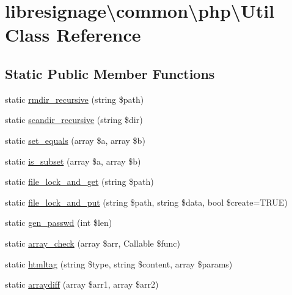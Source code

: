 \hypertarget{classlibresignage_1_1common_1_1php_1_1Util}{}\section{libresignage\textbackslash{}common\textbackslash{}php\textbackslash{}Util Class Reference}
\label{classlibresignage_1_1common_1_1php_1_1Util}
\subsection*{Static Public Member Functions}
\begin{DoxyCompactItemize}
\item 
static \hyperlink{classlibresignage_1_1common_1_1php_1_1Util_a8bd597e56331692f7839add43e70b2a5}{rmdir\+\_\+recursive} (string \$path)
\item 
static \hyperlink{classlibresignage_1_1common_1_1php_1_1Util_a8f938361f0ef775e8c1561fec505e40c}{scandir\+\_\+recursive} (string \$dir)
\item 
static \hyperlink{classlibresignage_1_1common_1_1php_1_1Util_a978ec58791862c65161cf2e6b06e75a1}{set\+\_\+equals} (array \$a, array \$b)
\item 
static \hyperlink{classlibresignage_1_1common_1_1php_1_1Util_a699286fe7901104c1849162017f22be7}{is\+\_\+subset} (array \$a, array \$b)
\item 
static \hyperlink{classlibresignage_1_1common_1_1php_1_1Util_a6515a0d313d4d6a929cd9a3b00d9eae5}{file\+\_\+lock\+\_\+and\+\_\+get} (string \$path)
\item 
static \hyperlink{classlibresignage_1_1common_1_1php_1_1Util_aac9e01c4936c976f5ffd712db0429b58}{file\+\_\+lock\+\_\+and\+\_\+put} (string \$path, string \$data, bool \$create=T\+R\+UE)
\item 
static \hyperlink{classlibresignage_1_1common_1_1php_1_1Util_ab8c8392529cfcfb2a143880c5d91f3bb}{gen\+\_\+passwd} (int \$len)
\item 
static \hyperlink{classlibresignage_1_1common_1_1php_1_1Util_ac5b8dc6b78eb2b1bf9a8b343cdfa38eb}{array\+\_\+check} (array \$arr, Callable \$func)
\item 
static \hyperlink{classlibresignage_1_1common_1_1php_1_1Util_a081033d9d7dc771b7d0339d1258a4d2d}{htmltag} (string \$type, string \$content, array \$params)
\item 
static \hyperlink{classlibresignage_1_1common_1_1php_1_1Util_a60b57f5edd6cf51e9fa4f89575d3e898}{arraydiff} (array \$arr1, array \$arr2)

\end{DoxyCompactItemize}

